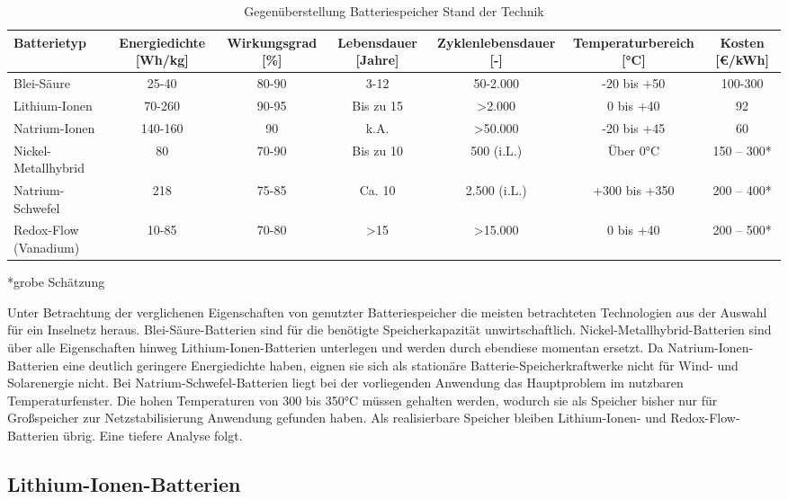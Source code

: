 \begin{table}[htbp]
    \centering
    \caption{Gegenüberstellung Batteriespeicher Stand der Technik}
    \label{tab:Gegenüberstellung_Batteriespeicher_Stand_der_Technik}
    \begin{tabular}{lcccccc}
        \toprule
        \textbf{Batterietyp} & \textbf{Energiedichte [Wh/kg]} & \textbf{Wirkungsgrad [\%]} & \textbf{Lebensdauer [Jahre]} & \textbf{Zyklenlebensdauer [-]} & \textbf{Temperaturbereich [°C]} & \textbf{Kosten [€/kWh]} \\
        \midrule
        Blei-Säure & 25-40 & 80-90 & 3-12 & 50-2.000 & -20 bis +50 & 100-300 \\
        Lithium-Ionen & 70-260 & 90-95 & Bis zu 15 & >2.000 & 0 bis +40 & 92 \\
        Natrium-Ionen & 140-160 & 90 & k.A. & >50.000 & -20 bis +45 & 60\cite{energieexperten} \\
        Nickel-Metallhybrid & 80 & 70-90 & Bis zu 10 & 500 (i.L.) & Über 0°C & 150 – 300* \\
        Natrium-Schwefel & 218 & 75-85 & Ca. 10 & 2.500 (i.L.) & +300 bis +350 & 200 – 400* \\
        Redox-Flow (Vanadium) & 10-85 & 70-80 & >15 & >15.000 & 0 bis +40 & 200 – 500* \\
        \bottomrule
    \end{tabular}
\end{table}
*grobe Schätzung

Unter Betrachtung der verglichenen Eigenschaften von genutzter Batteriespeicher die meisten betrachteten Technologien aus der Auswahl für ein Inselnetz heraus. Blei-Säure-Batterien sind für die benötigte Speicherkapazität unwirtschaftlich. Nickel-Metallhybrid-Batterien sind über alle Eigenschaften hinweg Lithium-Ionen-Batterien unterlegen und werden durch ebendiese momentan ersetzt. Da Natrium-Ionen-Batterien eine deutlich geringere Energiedichte haben, eignen sie sich als stationäre Batterie-Speicherkraftwerke nicht für Wind- und Solarenergie nicht. Bei Natrium-Schwefel-Batterien liegt bei der vorliegenden Anwendung das Hauptproblem im nutzbaren Temperaturfenster. Die hohen Temperaturen von 300 bis 350°C müssen gehalten werden, wodurch sie als Speicher bisher nur für Großspeicher zur Netzstabilisierung Anwendung gefunden haben. Als realisierbare Speicher bleiben Lithium-Ionen- und Redox-Flow-Batterien übrig. Eine tiefere Analyse folgt.

\subsection{Lithium-Ionen-Batterien}

